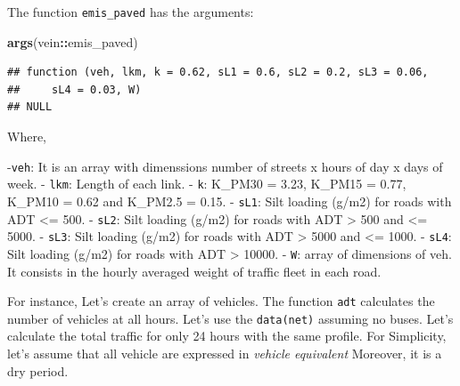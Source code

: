 \documentclass[12pt,graybox,envcountchap,sectrefs]{krantz}
\makeatletter
\newenvironment{Shaded}{\begin{snugshade}}{\end{snugshade}}
\newcommand{\KeywordTok}[1]{\textcolor[rgb]{0.13,0.29,0.53}{\textbf{#1}}}
\newcommand{\OperatorTok}[1]{\textcolor[rgb]{0.81,0.36,0.00}{\textbf{#1}}}
\newcommand{\NormalTok}[1]{#1}
\newenvironment{kframe}{%
\medskip{}
\setlength{\fboxsep}{.8em}
 \def\at@end@of@kframe{}%
 \ifinner\ifhmode%
  \def\at@end@of@kframe{\end{minipage}}%
  \begin{minipage}{\columnwidth}%
 \fi\fi%
 \def\FrameCommand##1{\hskip\@totalleftmargin \hskip-\fboxsep
 \colorbox{shadecolor}{##1}\hskip-\fboxsep
     \hskip-\linewidth \hskip-\@totalleftmargin \hskip\columnwidth}%
 \MakeFramed {\advance\hsize-\width
   \@totalleftmargin\z@ \linewidth\hsize
   \@setminipage}}%
 {\par\unskip\endMakeFramed%
 \at@end@of@kframe}
\renewenvironment{Shaded}{\begin{kframe}}{\end{kframe}}
\theoremstyle{definition}
\theoremstyle{definition}
\theoremstyle{definition}
\theoremstyle{remark}
\makeatother
\begin{document}
The function \texttt{emis\_paved} has the arguments:

\begin{Shaded}
\begin{Highlighting}[]
\KeywordTok{args}\NormalTok{(vein}\OperatorTok{::}\NormalTok{emis_paved)}
\end{Highlighting}
\end{Shaded}

\begin{verbatim}
## function (veh, lkm, k = 0.62, sL1 = 0.6, sL2 = 0.2, sL3 = 0.06, 
##     sL4 = 0.03, W) 
## NULL
\end{verbatim}

Where,

-\texttt{veh}: It is an array with dimenssions number of streets x hours
of day x days of week. - \texttt{lkm}: Length of each link. -
\texttt{k}: K\_PM30 = 3.23, K\_PM15 = 0.77, K\_PM10 = 0.62 and K\_PM2.5
= 0.15. - \texttt{sL1}: Silt loading (g/m2) for roads with ADT
\textless{}= 500. - \texttt{sL2}: Silt loading (g/m2) for roads with ADT
\textgreater{} 500 and \textless{}= 5000. - \texttt{sL3}: Silt loading
(g/m2) for roads with ADT \textgreater{} 5000 and \textless{}= 1000. -
\texttt{sL4}: Silt loading (g/m2) for roads with ADT \textgreater{}
10000. - \texttt{W}: array of dimensions of veh. It consists in the
hourly averaged weight of traffic fleet in each road.

For instance, Let's create an array of vehicles. The function
\texttt{adt} calculates the number of vehicles at all hours. Let's use
the \texttt{data(net)} assuming no buses. Let's calculate the total
traffic for only 24 hours with the same profile. For Simplicity, let's
assume that all vehicle are expressed in \emph{vehicle equivalent}
Moreover, it is a dry period.
\end{document}
